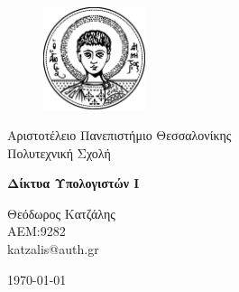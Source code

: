 \begin{titlepage}

\begin{figure}[h!]
  \begin{center}
    \includegraphics[width=3cm]{assets/auth.pdf}
    \label{fig:cover_auth_logo}
  \end{center}
\end{figure}

\centering
\Large Αριστοτέλειο Πανεπιστήμιο Θεσσαλονίκης\\
\Large Πολυτεχνική Σχολή\\

\vspace{\fill}

\LARGE \textbf{Δίκτυα Υπολογιστών Ι}

\vspace{\fill}

\Large Θεόδωρος Κατζάλης \\
\Large ΑΕΜ:9282 \\ 
\Large katzalis@auth.gr

\vspace{\fill}
\raggedright

\centering
\vspace{\fill}
\today

\end{titlepage}
